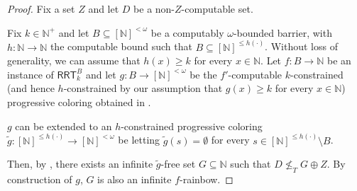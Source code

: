\documentclass{article}
\newcommand{\RRT}[0]{\mathsf{RRT}}
\newcommand{\NN}[0]{\mathbb{N}}
\begin{document}
\begin{proof}
Fix a set $Z$ and let $D$ be a non-$Z$-computable set.

Fix $k \in \NN^+$ and let $B \subseteq [\NN]^{<\omega}$ be a computably $\omega$-bounded barrier, with $h : \NN \to \NN$ the computable bound such that $B \subseteq [\NN]^{\leq h(\cdot)}$. Without loss of generality, we can assume that $h(x) \geq k$ for every $x \in \NN$. Let $f : B \to \NN$ be an instance of $\RRT^{B}_k$ and let $g : B \to [\NN]^{<\omega}$ be the $f'$-computable $k$-constrained (and hence $h$-constrained by our assumption that $g(x) \geq k$ for every $x \in \NN$) progressive coloring obtained in . 

$g$ can be extended to an $h$-constrained progressive coloring $\tilde{g} : [\NN]^{\leq h(\cdot)} \to [\NN]^{<\omega}$ be letting $\tilde{g}(s) = \emptyset$ for every $s \in  [\NN]^{\leq h(\cdot)} \setminus B$.

Then, by , there exists an infinite $\tilde{g}$-free set $G \subseteq \NN$ such that $D \not \leq_T G \oplus Z$. By construction of $g$, $G$ is also an infinite $f$-rainbow.
\end{proof}
\end{document}
